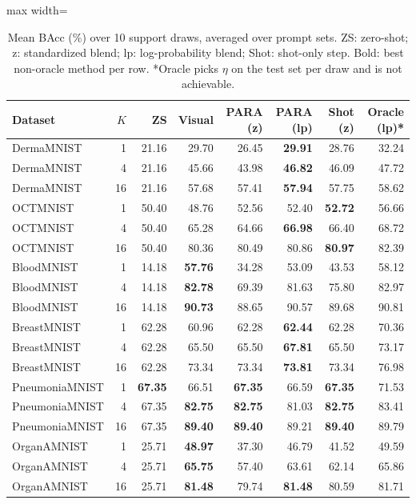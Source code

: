 \begin{table}[t]
\centering
\small
\caption{Mean BAcc (\%) over 10 support draws, averaged over prompt sets. ZS: zero-shot; z: standardized blend; lp: log-probability blend; Shot: shot-only step. Bold: best non-oracle method per row. *Oracle picks $\eta$ on the test set per draw and is not achievable.}
\label{tab:T2a_mean_bacc}
\begin{adjustbox}{max width=\linewidth}
\begin{tabular}{lrrrrrrr}
\toprule
Dataset & $K$ & ZS & Visual & PARA (z) & PARA (lp) & Shot (z) & Oracle (lp)* \\
\midrule
DermaMNIST & 1 & 21.16 & 29.70 & 26.45 & \textbf{29.91} & 28.76 & 32.24 \\
DermaMNIST & 4 & 21.16 & 45.66 & 43.98 & \textbf{46.82} & 46.09 & 47.72 \\
DermaMNIST & 16 & 21.16 & 57.68 & 57.41 & \textbf{57.94} & 57.75 & 58.62 \\
OCTMNIST & 1 & 50.40 & 48.76 & 52.56 & 52.40 & \textbf{52.72} & 56.66 \\
OCTMNIST & 4 & 50.40 & 65.28 & 64.66 & \textbf{66.98} & 66.40 & 68.72 \\
OCTMNIST & 16 & 50.40 & 80.36 & 80.49 & 80.86 & \textbf{80.97} & 82.39 \\
BloodMNIST & 1 & 14.18 & \textbf{57.76} & 34.28 & 53.09 & 43.53 & 58.12 \\
BloodMNIST & 4 & 14.18 & \textbf{82.78} & 69.39 & 81.63 & 75.80 & 82.97 \\
BloodMNIST & 16 & 14.18 & \textbf{90.73} & 88.65 & 90.57 & 89.68 & 90.81 \\
BreastMNIST & 1 & 62.28 & 60.96 & 62.28 & \textbf{62.44} & 62.28 & 70.36 \\
BreastMNIST & 4 & 62.28 & 65.50 & 65.50 & \textbf{67.81} & 65.50 & 73.17 \\
BreastMNIST & 16 & 62.28 & 73.34 & 73.34 & \textbf{73.81} & 73.34 & 76.98 \\
PneumoniaMNIST & 1 & \textbf{67.35} & 66.51 & \textbf{67.35} & 66.59 & \textbf{67.35} & 71.53 \\
PneumoniaMNIST & 4 & 67.35 & \textbf{82.75} & \textbf{82.75} & 81.03 & \textbf{82.75} & 83.41 \\
PneumoniaMNIST & 16 & 67.35 & \textbf{89.40} & \textbf{89.40} & 89.21 & \textbf{89.40} & 89.79 \\
OrganAMNIST & 1 & 25.71 & \textbf{48.97} & 37.30 & 46.79 & 41.52 & 49.59 \\
OrganAMNIST & 4 & 25.71 & \textbf{65.75} & 57.40 & 63.61 & 62.14 & 65.86 \\
OrganAMNIST & 16 & 25.71 & \textbf{81.48} & 79.74 & \textbf{81.48} & 80.59 & 81.71 \\
\bottomrule
\end{tabular}
\end{adjustbox}
\end{table}
